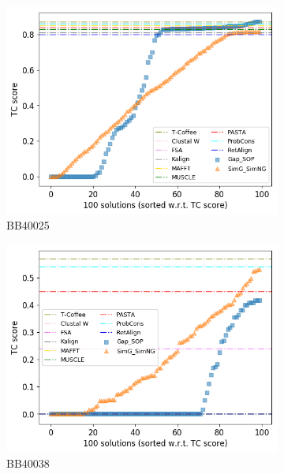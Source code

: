 \begin{figure}[!htbp]
\begin{adjustwidth}{-1cm}{-1cm}
		\begin{subfigure}{0.22\textwidth}
			\includegraphics[width=\columnwidth]{Figure/summary/precomputedInit/Balibase/BB40025_tc_density_single_run_2}
			\caption{BB40025}
		\end{subfigure}
		\begin{subfigure}{0.22\textwidth}
			\includegraphics[width=\columnwidth]{Figure/summary/precomputedInit/Balibase/BB40038_tc_density_single_run_2}
			\caption{BB40038}
		\end{subfigure}
		\begin{subfigure}{0.22\textwidth}

\end{subfigure}
\end{adjustwidth}
\end{figure}
